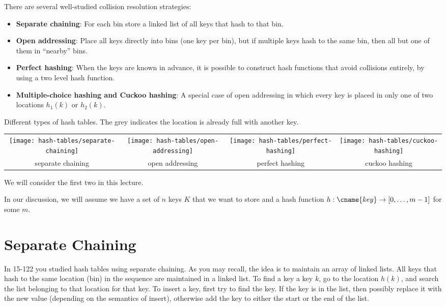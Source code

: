 There are several well-studied collision resolution strategies:
\begin{itemize}
\item \textbf{Separate chaining}: For each bin store a linked
list of all keys that hash to that bin.

\item \textbf{Open addressing}: Place all keys directly into bins (one
  key per bin), but if multiple keys hash to the same bin, then all but
  one of them in ``nearby'' bins.

\item \textbf{Perfect hashing}:
When the keys are known in advance, it is possible to construct 
hash functions that avoid collisions entirely, by using a two level
hash function.

\item \textbf{Multiple-choice hashing and Cuckoo hashing}:
A special case of open addressing in which every key is placed in 
only one of two locations $h_1(k)$ or $h_2(k)$.
\end{itemize}
\begin{example}

Different types of hash tables.  The grey indicates the location is
already full with another key.
\begin{center}\hspace*{-.25in}
\begin{tabular}{cccc}
\texttt{[image: hash-tables/separate-chaining]} &
\texttt{[image: hash-tables/open-addressing]} &
\texttt{[image: hash-tables/perfect-hashing]} &
\texttt{[image: hash-tables/cuckoo-hashing]} \\
separate chaining & open addressing & perfect hashing & cuckoo hashing
\end{tabular}
\end{center}
\end{example}
We will consider the first two in this lecture.

In our discussion, we will assume we have a set of $n$ keys $K$ that
we want to store and a hash function $h : \cname{key} \rightarrow [0,
  \ldots, m-1]$ for some $m$.


\section{Separate Chaining}

In 15-122 you studied hash tables using separate chaining.  As you may
recall, the idea is to maintain an array of linked lists.  All keys
that hash to the same location (bin) in the sequence are maintained in
a linked list.  To find a key a key $k$, go to the location $h(k)$,
and search the list belonging to that location for that key.  To
insert a key, first try to find the key.  If the key is in the list, then
possibly replace it with the new value (depending on the semantics of
insert), otherwise add the key to either the start or the end of the
list.

